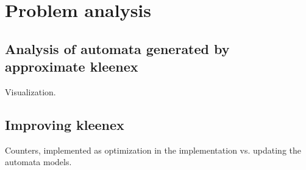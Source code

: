 \section{Problem analysis}

\subsection{Analysis of automata generated by approximate kleenex}

Visualization.

\subsection{Improving kleenex}

Counters, implemented as optimization in the implementation vs. updating the
automata models.
